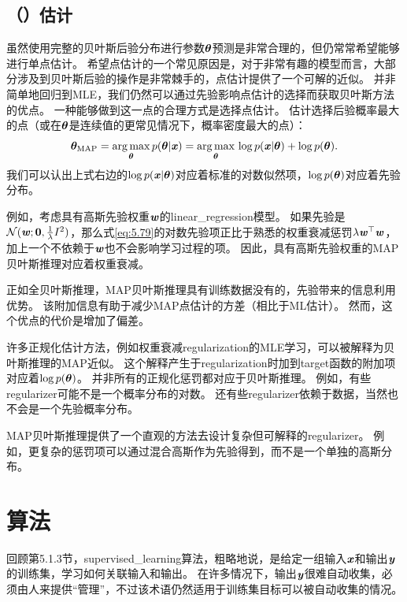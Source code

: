 \subsection{（）估计}
\label{sec:maximum_a_posteriori_map_estimation}
虽然使用完整的贝叶斯后验分布进行参数$\boldsymbol{\theta}$预测是非常合理的，但仍常常希望能够进行单点估计。
希望点估计的一个常见原因是，对于非常有趣的模型而言，大部分涉及到贝叶斯后验的操作是非常棘手的，点估计提供了一个可解的近似。
并非简单地回归到\gls{MLE}，我们仍然可以通过先验影响点估计的选择而获取贝叶斯方法的优点。
一种能够做到这一点的合理方式是选择点估计。
估计选择后验概率最大的点（或在$\boldsymbol{\theta}$是连续值的更常见情况下，概率密度最大的点）：
\begin{equation}
\label{eq:5.79}
    \boldsymbol{\theta}_{\text{MAP}} = \underset{\boldsymbol{\theta}}{\arg\max} \, p(\boldsymbol{\theta}|\boldsymbol{\mathit{x}})
    = \underset{\boldsymbol{\theta}}{\arg\max} \, \log p(\boldsymbol{\mathit{x}} | \boldsymbol{\theta}) + \log p(\boldsymbol{\theta}) .
\end{equation}
我们可以认出上式右边的$\log p(\boldsymbol{\mathit{x}} | \boldsymbol{\theta})$对应着标准的对数似然项，$\log p(\boldsymbol{\theta})$对应着先验分布。


例如，考虑具有高斯先验权重$\boldsymbol{\mathit{w}}$的\gls{linear_regression}模型。
如果先验是$\mathcal{N}(\boldsymbol{\mathit{w}};\mathbf{0},\frac{1}{\lambda}I^2)$，那么式\ref{eq:5.79}的对数先验项正比于熟悉的权重衰减惩罚$\lambda \boldsymbol{\mathit{w}}^\top\boldsymbol{\mathit{w}}$，加上一个不依赖于$\boldsymbol{\mathit{w}}$也不会影响学习过程的项。
因此，具有高斯先验权重的\gls{MAP}贝叶斯推理对应着权重衰减。

正如全贝叶斯推理，\gls{MAP}贝叶斯推理具有训练数据没有的，先验带来的信息利用优势。
该附加信息有助于减少\gls{MAP}点估计的方差（相比于ML估计）。
然而，这个优点的代价是增加了偏差。

许多正规化估计方法，例如权重衰减\gls{regularization}的\gls{MLE}学习，可以被解释为贝叶斯推理的\gls{MAP}近似。
这个解释产生于\gls{regularization}时加到\gls{target}函数的附加项对应着$\log p(\boldsymbol{\theta})$。
并非所有的正规化惩罚都对应于贝叶斯推理。
例如，有些\gls{regularizer}可能不是一个概率分布的对数。
还有些\gls{regularizer}依赖于数据，当然也不会是一个先验概率分布。

\gls{MAP}贝叶斯推理提供了一个直观的方法去设计复杂但可解释的\gls{regularizer}。
例如，更复杂的惩罚项可以通过混合高斯作为先验得到，而不是一个单独的高斯分布\citep{Nowlan-nips92}。

\section{算法}
\label{sec:supervised_learning_algorithms}
回顾第5.1.3节，\gls{supervised_learning}算法，粗略地说，是给定一组输入$\boldsymbol{\mathit{x}}$和输出$\boldsymbol{\mathit{y}}$的训练集，学习如何关联输入和输出。
在许多情况下，输出$\boldsymbol{\mathit{y}}$很难自动收集，必须由人来提供``管理''，不过该术语仍然适用于训练集目标可以被自动收集的情况。

